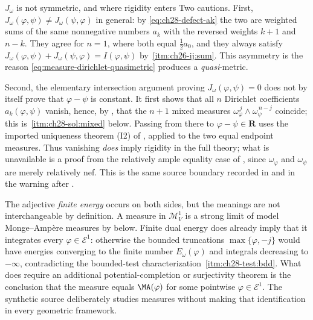 \begin{warning}{$J_\omega$ is not symmetric, and where rigidity enters}
Two cautions.  First, $J_\omega(\varphi,\psi)\neq J_\omega(\psi,\varphi)$
in general: by \eqref{eq:ch28-defect-ak} the two are weighted sums of the
same nonnegative numbers $a_k$ with the reversed weights $k+1$ and
$n-k$.  They agree for $n=1$, where both equal $\tfrac12a_0$, and they
always satisfy
$J_\omega(\varphi,\psi)+J_\omega(\psi,\varphi)=I(\varphi,\psi)$ by
\,\cref{itm:ch26-ij:sum}.  This
asymmetry is the reason
\eqref{eq:measure-dirichlet-quasimetric} produces a \emph{quasi}-metric.

Second, the elementary intersection argument proving
$J_\omega(\varphi,\psi)=0$ does not by itself prove that
$\varphi-\psi$ is constant.  It first shows that all $n$ Dirichlet
coefficients $a_k(\varphi,\psi)$ vanish, hence, by
, that the $n+1$ mixed measures
$\omega_\varphi^{\,j}\wedge\omega_\psi^{\,n-j}$ coincide; this is
\,\cref{itm:ch28-sol:mixed} below.  Passing from
there to $\varphi-\psi\in\mathbf R$ uses the imported uniqueness theorem
\textup{(I2)} of , applied to the two equal endpoint
measures.  Thus vanishing \emph{does} imply rigidity in the full theory;
what is unavailable is a proof from the relatively ample equality case of
, since $\omega_\varphi$ and
$\omega_\psi$ are merely relatively nef.  This is the same source
boundary recorded in  and in the warning after
.
\end{warning}

\begin{remark}
\label{rem:ch28-two-energies}
The adjective \emph{finite energy} occurs on both sides, but the meanings
are not interchangeable by definition.  A measure in
$\mathcal M^1_V$ is a strong limit of model Monge--Amp\`ere measures by
 below.  Finite dual energy does
already imply that it integrates every $\varphi\in\mathcal E^1$: otherwise
the bounded truncations $\max\{\varphi,-j\}$ would have energies converging
to the finite number $E_\omega(\varphi)$ and integrals decreasing to
$-\infty$, contradicting the bounded-test characterization
\,\cref{itm:ch28-test:bdd}.  What does require an
additional potential-completion or surjectivity theorem is the conclusion
that the measure equals $\MA(\varphi)$ for some pointwise
$\varphi\in\mathcal E^1$.  The synthetic source
\cite{BJ25FiniteEnergy} deliberately studies measures without making that
identification in every geometric framework.
\end{remark}

